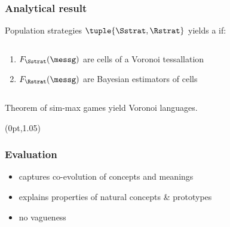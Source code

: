 \documentclass[fleqn,9pt,xcolor=dvipsnames]{beamer}
\newcommand{\mygray}[1]{{\color{gray}{#1}}}
\newcommand{\mycol}[1]{{\color{mycol}{#1}}}
\newcommand{\slideFN}[1]{%
  \begin{textblock*}{\paperwidth}(0pt,1.05\textheight)
    \hfill \footnotesize{\mygray{#1}} \hspace{.5em}
  \end{textblock*}}
\begin{document}
\begin{frame}
  \frametitle{Analytical result}


    Population strategies $\tuple{\Sstrat,\Rstrat}$ yields a
     if:
      \vspace{-0.2cm}
      \begin{columns}[t]
        \begin{column}[T]{0.65\textwidth}
          \begin{enumerate}
          \item $F_\Sstrat(\messg)$ are cells of a Voronoi
            tessallation
          \item $F_\Rstrat(\messg)$ are Bayesian estimators of cells
          \end{enumerate}
        \end{column}
        \begin{column}[T]{0.25\textwidth}
          \hfill \setlength\fboxsep{0pt} \setlength\fboxrule{0.5pt}
        \end{column}
      \end{columns}


  \bigskip

 

  \begin{block}{Theorem}
    \ESSs of sim-max games yield Voronoi languages.
  \end{block}

  \slideFN{\citep{JagerMetzger2011:Voronoi-Languag}}
\end{frame}


\begin{frame}
  \frametitle{Evaluation}
    \vspace{0.3cm}

    \mycol{pro:}
    
    \begin{itemize}
    \item captures co-evolution of concepts and meanings
    \item explains properties of natural concepts \& prototypes\\
      \vspace{-0.13cm} \hspace{4.6cm}
      {\footnotesize{\color{gray}{(convexity)}}}
      \hspace{0.4cm} {\footnotesize{\color{gray}{(centrality)}}}
    \end{itemize}
 
    

    \vspace{0.3cm}
    
    \mycol{contra:}
    
    \begin{itemize}
    \item no vagueness
    \end{itemize}


\end{frame}
\end{document}

